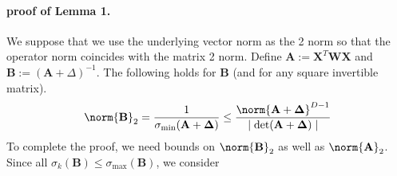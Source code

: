     \paragraph{proof of Lemma 1.}
       We suppose that we use the underlying vector norm as the 2 norm so that the operator norm coincides with the matrix 2 norm.
        Define $\mathbf{A} := \mathbf{X}^T \mathbf{W} \mathbf{X}$ and $\mathbf{B} := (\mathbf{A} + \Delta)^{-1}$. The following holds for $\mathbf{B}$ (and for any square invertible matrix).
        \begin{gather*}
            \norm{\mathbf{B}}_2 = \frac{1}{\sigma_{\min}(\mathbf{\mathbf{A} + \Delta})} \leq \frac{\norm{\mathbf{\mathbf{A} + \Delta}}^{D-1}}{\mid \det(\mathbf{\mathbf{A} + \Delta})\mid}%
        \end{gather*}
        To complete the proof, we need bounds on $\norm{\mathbf{B}}_2$ as well as $\norm{\mathbf{A}}_2$.
        Since all $\sigma_k(\mathbf{B})\leq \sigma_{\max}(\mathbf{B})$, we consider
